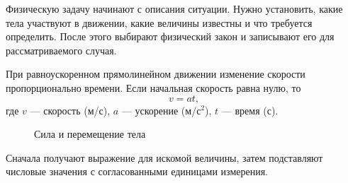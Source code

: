 \documentclass[12pt,a4paper]{article}
\begin{document}
Физическую задачу начинают с описания ситуации. Нужно установить, какие тела
участвуют в движении, какие величины известны и что требуется определить.
После этого выбирают физический закон и записывают его для рассматриваемого
случая.

При равноускоренном прямолинейном движении изменение скорости
пропорционально времени. Если начальная скорость равна нулю, то
\[
v=at,
\]
где $v$ — скорость (м/с), $a$ — ускорение (м/с$^2$), $t$ — время (с).

\begin{figure}[ht]
\centering
{}
\caption{Сила и перемещение тела}
\end{figure}

Сначала получают выражение для искомой величины, затем подставляют числовые
значения с согласованными единицами измерения.
\end{document}
